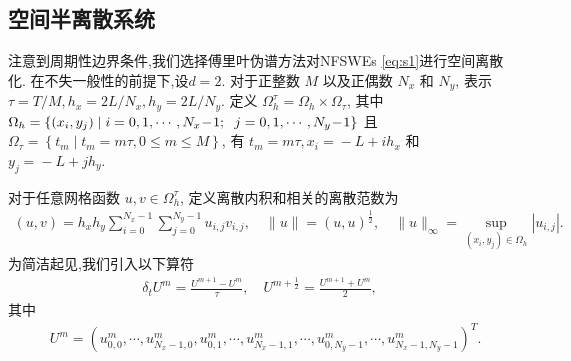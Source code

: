 	
\subsection{空间半离散系统}
注意到周期性边界条件,我们选择傅里叶伪谱方法对NFSWEs \eqref{eq:s1}进行空间离散化.
在不失一般性的前提下,设$d=2$.
对于正整数 $M$ 以及正偶数 $N_{x}$ 和 $N_{y}$, 表示 $\tau={T}/{M}, h_{x}={2 L}/{N_{x}}, h_{y}={2 L}/{N_{y}}$. 定义 $\Omega_{h}^{\tau}=\Omega_{h} \times \Omega_{\tau}$, 其中 $\Omega_{h}=\left\{\left(x_{i}, y_{j}\right) \mid i=0,1, \cdots, N_{x}\!-\!1;\right.\\ \left.j=0,1, \cdots, N_{y}\!-\!1\right\}$ 且 $\Omega_{\tau}=\left\{t_{m} \mid t_{m}=m \tau, 0 \leq m \leq M\right\}$, 有 $t_{m}=m \tau, x_{i}\!=\!-L+i h_{x}$ 和 $y_{j}\!=\!-L+j h_{y}$.

对于任意网格函数 $u,v\in \Omega_{h}^{\tau}$,
定义离散内积和相关的离散范数为
\begin{align}\label{eq_48}
(u, v)=h_{x} h_{y} \sum_{i=0}^{N_{x}-1} \sum_{j=0}^{N_{y}-1} u_{i, j} v_{i, j}, \quad\|u\|=(u, u)^{\frac{1}{2}}, \quad\|u\|_{\infty}=\sup _{\left(x_{i}, y_{j}\right) \in \Omega_{h}}\left|u_{i, j}\right|.
\end{align}
为简洁起见,我们引入以下算符
\begin{align}\label{eq_49}
\delta_{t} U^{m}=\frac{U^{m+1}-U^{m}}{\tau}, \quad U^{m+\frac{1}{2}}=\frac{U^{m+1}+U^{m}}{2},
\end{align}
其中
\begin{align}\label{eq_47}
&U^m=\left(u_{0,0}^m, \cdots, u_{N_{x}-1,0}^m, u_{0,1}^m, \cdots, u_{N_{x}-1,1}^m, \cdots, u_{0, N_{y}-1}^m, \cdots, u_{N_{x}-1, N_{y}-1}^m\right)^{T}. %
\end{align}


